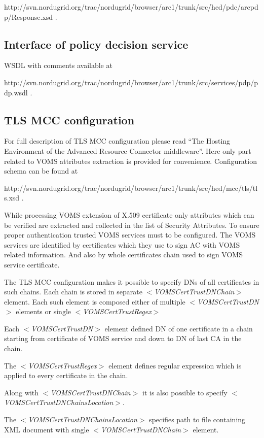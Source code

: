 \documentclass{book}
\begin{document}
http://svn.nordugrid.org/trac/nordugrid/browser/arc1/trunk/src/hed/pdc/arcpdp/Response.xsd .


\subsection{Interface of policy decision service} %
\label{subsec:interface_pds}
WSDL with comments available at 

http://svn.nordugrid.org/trac/nordugrid/browser/arc1/trunk/src/services/pdp/pdp.wsdl .


\subsection{TLS MCC configuration} %
\label{subsec:tlsmcc_conf}
For full description of TLS MCC configuration please read ``The Hosting Environment of the Advanced Resource Connector middleware''. Here only part related to VOMS attributes extraction is provided for convenience. Configuration schema can be found at 

http://svn.nordugrid.org/trac/nordugrid/browser/arc1/trunk/src/hed/mcc/tls/tls.xsd .

While processing VOMS extension of X.509 certificate only attributes which can be verified are extracted and collected in the list of Security Attributes. To ensure proper authentication trusted VOMS services must to be configured. The VOMS services are identified by certificates which they use to sign AC with VOMS related information. And also by whole certificates chain used to sign VOMS service certificate. 

The TLS MCC configuration makes it possible to specify DNs of all certificates in such chains. Each chain is stored in separate \textit{$<$VOMSCertTrustDNChain$>$} element. Each such element is composed either of multiple \textit{$<$VOMSCertTrustDN$>$} elements or single \textit{$<$VOMSCertTrustRegex$>$}

Each \textit{$<$VOMSCertTrustDN$>$} element defined DN of one certificate in a chain starting from certificate of VOMS service and down to DN of last CA in the chain.

The \textit{$<$VOMSCertTrustRegex$>$} element defines regular expression which is applied to every certificate in the chain.

Along with \textit{$<$VOMSCertTrustDNChain$>$} it is also possible to specify \textit{$<$VOMSCertTrustDNChainsLocation$>$}.

The \textit{$<$VOMSCertTrustDNChainsLocation$>$} specifies path to file containing XML document with single \textit{$<$VOMSCertTrustDNChain$>$} element.
\end{document}
